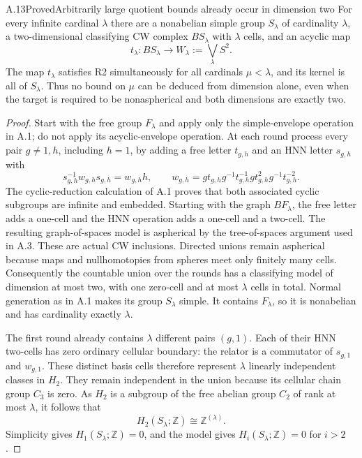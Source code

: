 \begin{claim}{A.13}{Proved}{Arbitrarily large quotient bounds already occur in dimension two}
For every infinite cardinal $\lambda$ there are a nonabelian simple group
$S_\lambda$ of cardinality $\lambda$, a two-dimensional classifying
CW complex $B S_\lambda$ with $\lambda$ cells, and an acyclic map
\[
 t_\lambda:B S_\lambda\longrightarrow
 W_\lambda:=\bigvee_{\lambda}S^2.
\]
The map $t_\lambda$ satisfies R2 simultaneously for all cardinals
$\mu<\lambda$, and its kernel is all of $S_\lambda$. Thus no bound
on $\mu$ can be deduced from dimension alone, even when the target
is required to be nonaspherical and both dimensions are exactly two.
\end{claim}
\begin{proof}
Start with the free group $F_\lambda$ and apply only the simple-envelope
operation in A.1; do not apply its acyclic-envelope operation. At each
round process every pair $g\ne1,h$, including $h=1$, by adding a free
letter $t_{g,h}$ and an HNN letter $s_{g,h}$ with
\[
 s_{g,h}^{-1}w_{g,h}s_{g,h}=w_{g,h}h,
 \qquad
 w_{g,h}=g t_{g,h}g^{-1}t_{g,h}^{-1}
                 g t_{g,h}^{2}g^{-1}t_{g,h}^{-2}.
\]
The cyclic-reduction calculation of A.1 proves that both associated
cyclic subgroups are infinite and embedded. Starting with the graph
$BF_\lambda$, the free letter adds a one-cell and the HNN operation
adds a one-cell and a two-cell. The resulting graph-of-spaces model
is aspherical by the tree-of-spaces argument used in A.3. These are
actual CW inclusions. Directed unions remain aspherical because
maps and nullhomotopies from spheres meet only finitely many cells.
Consequently the countable union over the rounds has a
classifying model of dimension at most two, with one zero-cell
and at most $\lambda$ cells in total. Normal generation as in A.1
makes its group $S_\lambda$ simple. It contains $F_\lambda$, so it
is nonabelian and has cardinality exactly $\lambda$.

The first round already contains $\lambda$ different pairs
$(g,1)$. Each of their HNN two-cells has zero ordinary cellular
boundary: the relator is a commutator of $s_{g,1}$ and $w_{g,1}$.
These distinct basis cells therefore represent $\lambda$
linearly independent classes in $H_2$. They remain independent
in the union because its cellular chain group $C_3$ is zero.
As $H_2$ is a subgroup of the free abelian group $C_2$ of rank at
most $\lambda$, it follows that
\[
 H_2(S_\lambda;\mathbb Z)\cong\mathbb Z^{(\lambda)}.
\]
Simplicity gives $H_1(S_\lambda;\mathbb Z)=0$, and the model gives
$H_i(S_\lambda;\mathbb Z)=0$ for $i>2$.


\end{proof}
